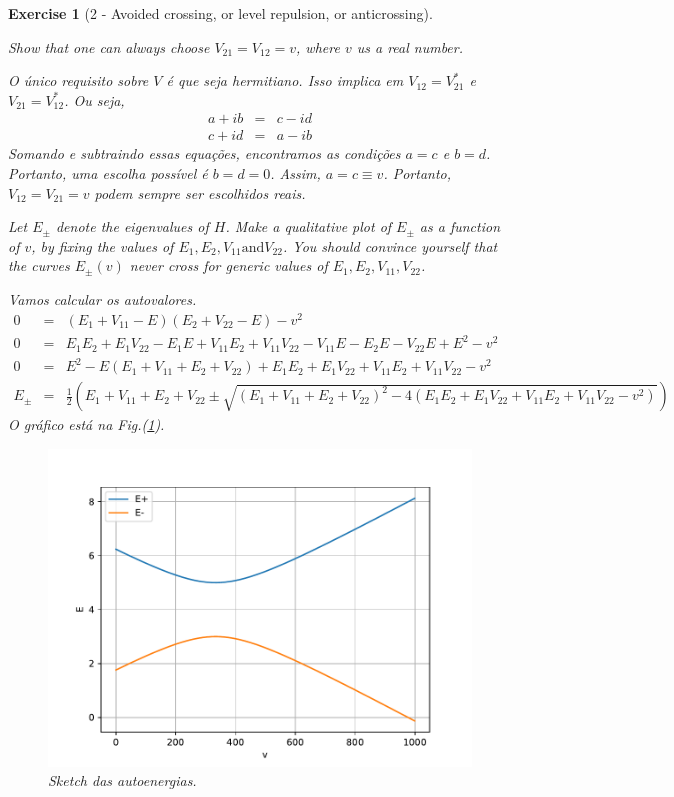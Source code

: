\documentclass[12pt]{article}
\def\bea{\begin{eqnarray*}}
\def\eea{\end{eqnarray*}}
\def\f{\frac}
\def\l{\left}
\def\r{\right}
\newtheorem{exercise}{Exercise}
\begin{document}
	
	\begin{exercise}[2 - Avoided crossing, or level repulsion, or anticrossing]
		\begin{exercises}
			\item Show that one can always choose $V_{21} = V_{12} = v$, where $v$ us a real number.
			\begin{multianswer}
				O único requisito sobre $V$ é que seja hermitiano. Isso implica em $V_{12} = V_{21}^*$ e $V_{21} = V_{12}^*$. Ou seja,
				\bea
					a + ib &=& c - id \\
					c + id &=& a - ib
				\eea
				Somando e subtraindo essas equações, encontramos as condições $a=c$ e $b=d$. Portanto, uma escolha possível é $b=d=0$. Assim, $a=c\equiv v$. Portanto, $V_{12}=V_{21}=v$ podem sempre ser escolhidos reais. 
			\end{multianswer}
			
			\item  Let $E_\pm$ denote the eigenvalues of $H$. Make a qualitative plot of $E_\pm$ as a function of $v$, by fixing the values of $E_1 , E_2 , V_{11} \text{and} V_{22}$. You should convince yourself that the curves $E_\pm(v)$ never cross for generic values of $E_1 , E_2 , V_{11}, V_{22}$.
			\begin{multianswer}
				Vamos calcular os autovalores. 
				\bea
					0 &=& (E_1 + V_{11} - E)(E_2 + V_{22} - E) - v^2 \\
					0 &=& E_1E_2 + E_1V_{22} - E_1E + V_{11}E_2 + V_{11}V_{22} - V_{11}E - E_2E - V_{22}E + E^2 - v^2 \\
					0 &=& E^2 - E(E_1 + V_{11} +E_2 + V_{22}) + E_1E_2 + E_1V_{22} + V_{11}E_2 + V_{11}V_{22} - v^2 \\
					E_\pm &=& \f{1}{2}\l( E_1 + V_{11} +E_2 + V_{22} \pm \sqrt{ (E_1 + V_{11} +E_2 + V_{22})^2 - 4(E_1E_2 + E_1V_{22} + V_{11}E_2 + V_{11}V_{22} - v^2)} \r)
				\eea
				O gráfico está na Fig.(\ref{fig:fige}).
				\begin{figure}
					\centering
					\includegraphics[width=0.7\linewidth]{Images/figE}
					\caption{Sketch das autoenergias.}
					\label{fig:fige}
				\end{figure}
			\end{multianswer}
			

\end{exercises}
\end{exercise}
\end{document}
